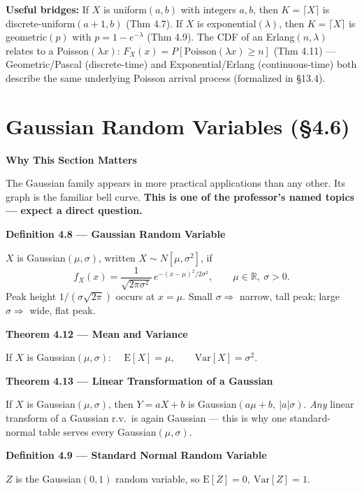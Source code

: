 \documentclass[11pt]{article}
\newcommand{\E}[1]{\mathrm{E}\left[#1\right]}
\newcommand{\Var}[1]{\mathrm{Var}\left[#1\right]}
\newcommand{\topline}[1]{\par\vspace{5pt}\noindent{\color{#1}\rule{\linewidth}{1.1pt}}\par\vspace{3pt}}
\newcommand{\botline}[1]{\par\vspace{2pt}\noindent{\color{#1}\rule{\linewidth}{1.1pt}}\par\vspace{8pt}}
\newenvironment{defbox}[2]{%
  \topline{defcol}\noindent\textbf{\color{defcol}Definition #1 --- #2}\par\smallskip\noindent\ignorespaces
}{\botline{defcol}}
\newenvironment{thmbox}[2]{%
  \topline{thmcol}\noindent\textbf{\color{thmcol}Theorem #1 --- #2}\par\smallskip\noindent\ignorespaces
}{\botline{thmcol}}
\newenvironment{notebox}[1]{%
  \topline{notecol}\noindent\textbf{\color{notecol}#1}\par\smallskip\noindent\ignorespaces
}{\botline{notecol}}
\begin{document}
\textbf{Useful bridges:} If $X$ is uniform$(a,b)$ with integers $a,b$, then $K=\lceil X\rceil$
is discrete-uniform$(a{+}1,b)$ (Thm 4.7). If $X$ is exponential$(\lambda)$, then
$K=\lceil X\rceil$ is geometric$(p)$ with $p=1-e^{-\lambda}$ (Thm 4.9). The CDF of an
Erlang$(n,\lambda)$ relates to a Poisson$(\lambda x)$: $F_X(x) = P[\text{Poisson}(\lambda x)\ge n]$
(Thm 4.11) --- Geometric/Pascal (discrete-time) and Exponential/Erlang (continuous-time) both
describe the same underlying Poisson arrival process (formalized in \S13.4).

\clearpage
\section{Gaussian Random Variables (\S4.6)}
\label{sec:gaussian}

\begin{notebox}{Why This Section Matters}
The Gaussian family appears in more practical applications than any other. Its graph is the
familiar bell curve. \textbf{This is one of the professor's named topics --- expect a direct
question.}
\end{notebox}

\begin{defbox}{4.8}{Gaussian Random Variable}
$X$ is Gaussian$(\mu,\sigma)$, written $X\sim N[\mu,\sigma^2]$, if
\[ f_X(x) = \frac{1}{\sqrt{2\pi\sigma^2}}\,e^{-(x-\mu)^2/2\sigma^2}, \qquad \mu\in\mathbb{R},\ \sigma>0. \]
Peak height $1/(\sigma\sqrt{2\pi})$ occurs at $x=\mu$. Small $\sigma\Rightarrow$ narrow, tall
peak; large $\sigma\Rightarrow$ wide, flat peak.
\end{defbox}

\begin{thmbox}{4.12}{Mean and Variance}
If $X$ is Gaussian$(\mu,\sigma)$: $\quad \E{X}=\mu, \qquad \Var{X}=\sigma^2$.
\end{thmbox}

\begin{thmbox}{4.13}{Linear Transformation of a Gaussian}
If $X$ is Gaussian$(\mu,\sigma)$, then $Y=aX+b$ is Gaussian$(a\mu+b,\ |a|\sigma)$. \emph{Any}
linear transform of a Gaussian r.v.\ is again Gaussian --- this is why one standard-normal
table serves every Gaussian$(\mu,\sigma)$.
\end{thmbox}

\begin{defbox}{4.9}{Standard Normal Random Variable}
$Z$ is the Gaussian$(0,1)$ random variable, so $\E{Z}=0,\ \Var{Z}=1$.
\end{defbox}
\end{document}
